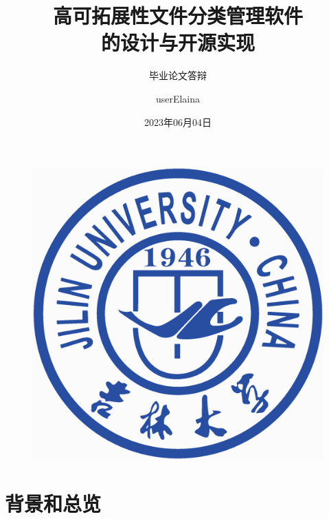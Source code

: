 \documentclass{beamer}
\author{userElaina}
\title{高可拓展性文件分类管理软件\\的设计与开源实现}
\subtitle{毕业论文答辩}
\institute{航空航天器械清洁学院}
\date{2023年06月04日}
\begin{document}
\kaishu
\begin{frame}
    \titlepage
    \begin{figure}[htpb]
        \begin{center}
            \includegraphics[width=0.15\linewidth]{pic/Jilin_University_Logo.eps}
        \end{center}
    \end{figure}
\end{frame}

\begin{frame}
    \tableofcontents[sectionstyle=show,subsectionstyle=show/shaded/hide,subsubsectionstyle=show/shaded/hide]
\end{frame}


\section{背景和总览}
\end{document}
